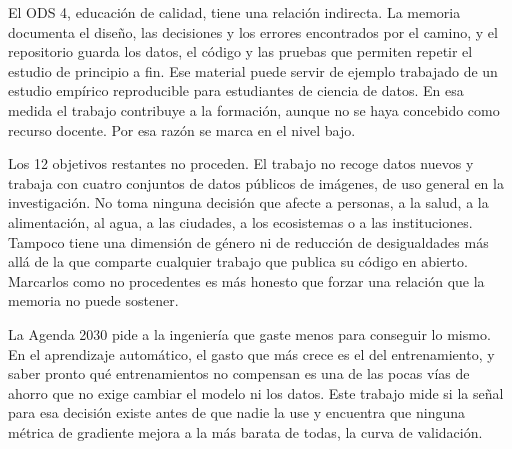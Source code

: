 El ODS 4, educación de calidad, tiene una relación indirecta. La memoria documenta el diseño, las decisiones y los errores encontrados por el camino, y el repositorio guarda los datos, el código y las pruebas que permiten repetir el estudio de principio a fin. Ese material puede servir de ejemplo trabajado de un estudio empírico reproducible para estudiantes de ciencia de datos. En esa medida el trabajo contribuye a la formación, aunque no se haya concebido como recurso docente. Por esa razón se marca en el nivel bajo.

Los 12 objetivos restantes no proceden. El trabajo no recoge datos nuevos y trabaja con cuatro conjuntos de datos públicos de imágenes, de uso general en la investigación. No toma ninguna decisión que afecte a personas, a la salud, a la alimentación, al agua, a las ciudades, a los ecosistemas o a las instituciones. Tampoco tiene una dimensión de género ni de reducción de desigualdades más allá de la que comparte cualquier trabajo que publica su código en abierto. Marcarlos como no procedentes es más honesto que forzar una relación que la memoria no puede sostener.

La Agenda 2030 pide a la ingeniería que gaste menos para conseguir lo mismo. En el aprendizaje automático, el gasto que más crece es el del entrenamiento, y saber pronto qué entrenamientos no compensan es una de las pocas vías de ahorro que no exige cambiar el modelo ni los datos. Este trabajo mide si la señal para esa decisión existe antes de que nadie la use y encuentra que ninguna métrica de gradiente mejora a la más barata de todas, la curva de validación.
